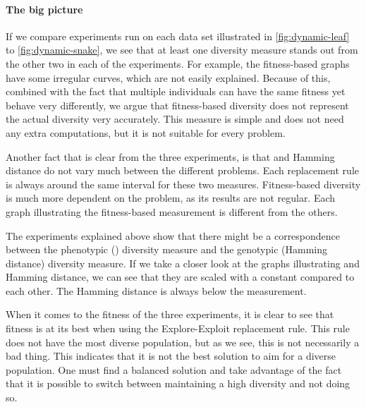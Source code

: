 

\paragraph{The big picture} If we compare experiments run on each data set illustrated in \cref{fig:dynamic-leaf} to \cref{fig:dynamic-snake}, we see that at least one diversity measure stands out from the other two in each of the experiments. For example, the fitness-based graphs have some irregular curves, which are not easily explained. Because of this, combined with the fact that multiple individuals can have the same fitness yet behave very differently, we argue that fitness-based diversity does not represent the actual diversity very accurately. This measure is simple and does not need any extra computations, but it is not suitable for every problem. 

Another fact that is clear from the three experiments, is that \dia{} and Hamming distance do not vary much between the different problems. Each replacement rule is always around the same interval for these two measures. Fitness-based diversity is much more dependent on the problem, as its results are not regular. Each graph illustrating the fitness-based measurement is different from the others.

The experiments explained above show that there might be a correspondence between the phenotypic (\dia{}) diversity measure and the genotypic (Hamming distance) diversity measure. If we take a closer look at the graphs illustrating \dia{} and Hamming distance, we can see that they are scaled with a constant compared to each other. The Hamming distance is always below the \dia{} measurement.%

When it comes to the fitness of the three experiments, it is clear to see that fitness is at its best when using the Explore-Exploit replacement rule. This rule does not have the most diverse population, but as we see, this is not necessarily a bad thing. This indicates that it is not the best solution to aim for a  diverse population. One must find a balanced solution and take advantage of the fact that it is possible to switch between maintaining a high diversity and not doing so.
